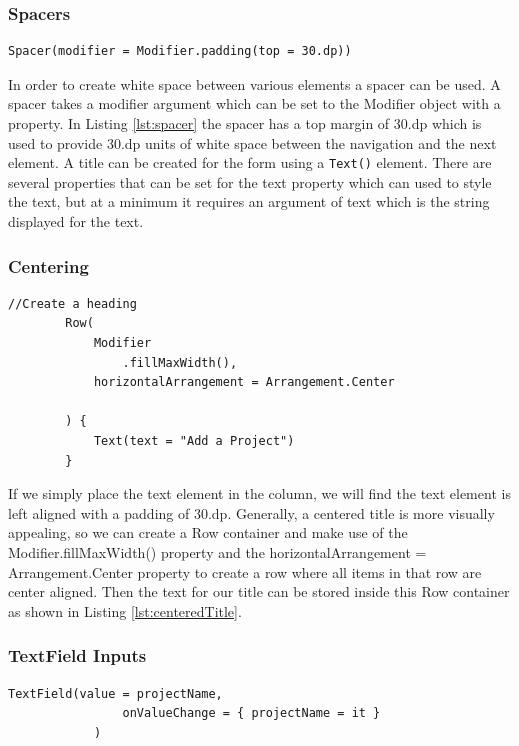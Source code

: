 \documentclass[12pt]{article}
\begin{document}
\subsubsection{Spacers}

\begin{lstlisting}[numbers=none, 
			caption=Using Spacers,
			label={lst:spacer}]
 Spacer(modifier = Modifier.padding(top = 30.dp))
\end{lstlisting}
In order to create white space between various elements a spacer can be used. A spacer takes a modifier argument which can be set to the Modifier object with a property. In Listing \ref{lst:spacer} the spacer has a top margin of 30.dp which is used to provide 30.dp units of white space between the navigation and the next element. 
A title can be created for the form using a \verb|Text()| element. There are several properties that can be set for the text property which can used to style the text, but at a minimum it requires an argument of text which is the string displayed for the text. 
\subsubsection{Centering}
\begin{lstlisting}[numbers=none, 
			caption=Centered Text,
			label={lst:centeredTitle}]
  //Create a heading
        Row(
            Modifier
                .fillMaxWidth(),
            horizontalArrangement = Arrangement.Center

        ) {
            Text(text = "Add a Project")
        }

\end{lstlisting}
If we simply place the text element in the column, we will find the text element is left aligned with a padding of 30.dp. Generally, a centered title is more visually appealing, so we can create a Row container and make use of the Modifier.fillMaxWidth() property and the horizontalArrangement = Arrangement.Center property to create a row where all items in that row are center aligned. Then the text for our title can be stored inside this Row container as shown in Listing \ref{lst:centeredTitle}. 

\subsubsection{TextField Inputs}

\begin{lstlisting}[numbers=none, 
			caption=TextField inputs,
			label={lst:textField}]
  TextField(value = projectName,
                onValueChange = { projectName = it }
            )
\end{lstlisting}
\end{document}
